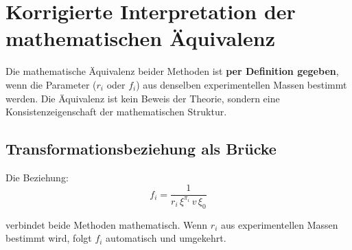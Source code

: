 \section{Korrigierte Interpretation der mathematischen Äquivalenz}
\label{sec:corrected_interpretation}

\begin{keypoint}
	Die mathematische Äquivalenz beider Methoden ist \textbf{per Definition gegeben}, wenn die Parameter ($r_i$ oder $f_i$) aus denselben experimentellen Massen bestimmt werden. Die Äquivalenz ist kein Beweis der Theorie, sondern eine Konsistenzeigenschaft der mathematischen Struktur.
\end{keypoint}

\subsection{Transformationsbeziehung als Brücke}
\label{subsec:transformation_relationship}

Die Beziehung:
\begin{equation}
	f_i = \frac{1}{r_i \, \xi^{\pi_i} \, v \, \xi_0}
	\label{eq:transformation_bridge}
\end{equation}

verbindet beide Methoden mathematisch. Wenn $r_i$ aus experimentellen Massen bestimmt wird, folgt $f_i$ automatisch und umgekehrt.

\begin{table}[H]
	\centering
	\caption{Numerische Äquivalenz beider T0-Methoden für alle Leptonen}
	\label{tab:numerical_equivalence_complete}
\end{table}


